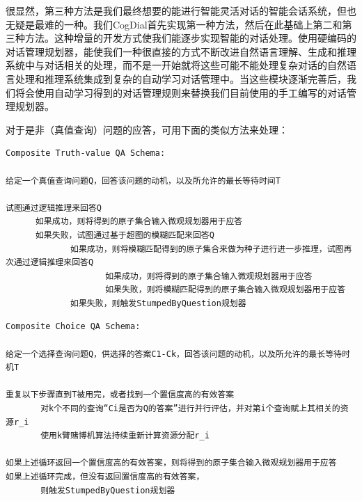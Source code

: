 \noindent 很显然，第三种方法是我们最终想要的能进行智能灵活对话的智能会话系统，但也无疑是最难的一种。我们CogDial首先实现第一种方法，然后在此基础上第二和第三种方法。这种增量的开发方式使我们能逐步实现智能的对话处理。使用硬编码的对话管理规划器，能使我们一种很直接的方式不断改进自然语言理解、生成和推理系统中与对话相关的处理，而不是一开始就将这些可能不能处理复杂对话的自然语言处理和推理系统集成到复杂的自动学习对话管理中。当这些模块逐渐完善后，我们将会使用自动学习得到的对话管理规则来替换我们目前使用的手工编写的对话管理规划器。

对于是非（真值查询）问题的应答，可用下面的类似方法来处理：

\begin{verbatim}
Composite Truth-value QA Schema:

给定一个真值查询问题Q，回答该问题的动机，以及所允许的最长等待时间T

试图通过逻辑推理来回答Q
      如果成功，则将得到的原子集合输入微观规划器用于应答
      如果失败，试图通过基于超图的模糊匹配来回答Q
             如果成功，则将模糊匹配得到的原子集合来做为种子进行进一步推理，试图再次通过逻辑推理来回答Q
                    如果成功，则将得到的原子集合输入微观规划器用于应答
                    如果失败，则将模糊匹配得到的原子集合输入微观规划器用于应答
             如果失败，则触发StumpedByQuestion规划器

\end{verbatim}	

\begin{verbatim}
Composite Choice QA Schema:

给定一个选择查询问题Q，供选择的答案C1-Ck，回答该问题的动机，以及所允许的最长等待时机T

重复以下步骤直到T被用完，或者找到一个置信度高的有效答案
       对k个不同的查询“Ci是否为Q的答案”进行并行评估，并对第i个查询赋上其相关的资源r_i
       使用k臂赌博机算法持续重新计算资源分配r_i

如果上述循环返回一个置信度高的有效答案，则将得到的原子集合输入微观规划器用于应答
如果上述循环完成，但没有返回置信度高的有效答案，
       则触发StumpedByQuestion规划器


\end{verbatim}	
			

